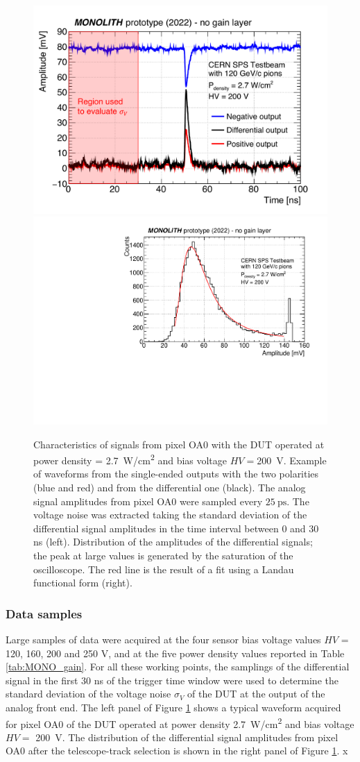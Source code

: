 		\begin{figure}[!htb]
			\centering
			\includegraphics[width=.49\textwidth]{files/MONOLITH_paper/waveform_with_bck_region.pdf}
			\includegraphics[width=.49\textwidth]{files/MONOLITH_paper/amplitude.pdf}
			\caption{Characteristics of signals from  pixel OA0 with the DUT operated at power density \power = \SI{2.7}{\watt/\centi\meter^2} and bias voltage $HV=$\SI{200}{\volt}. Example of waveforms from the single-ended outputs with the two polarities (blue and red) and from the differential one (black). The analog signal amplitudes from pixel OA0 were sampled every $\SI{25}{\pico\second}$.  The voltage noise \noise was extracted taking the standard deviation of the differential signal amplitudes in the time interval between 0 and 30 ns (left). Distribution of the amplitudes of the differential signals; the peak at large values is generated by the saturation of the oscilloscope. The red line is the result of a fit using a Landau functional form (right).}
			\label{im:MONO_waveform} 
		\end{figure}

		\subsubsection{Data samples}
		Large samples of data were acquired at the four sensor bias voltage values $HV$ = 120, 160, 200 and 250 V, and at the five power density values reported in Table \ref{tab:MONO_gain}.
		For all these working points, the samplings of the differential signal in the first 30 ns of the trigger time window were used to determine the standard deviation of the voltage noise $\sigma_V$ of the DUT at the output of the analog front end. The left panel of Figure \ref{im:MONO_waveform} shows a typical waveform acquired for pixel OA0 of the DUT operated at power density \power \SI{2.7}{\watt/\centi\meter^2} and bias voltage $HV=$ \SI{200}{\volt}.
		The distribution of the differential signal amplitudes from pixel OA0 after the telescope-track selection is shown in the right panel of Figure \ref{im:MONO_waveform}.
x
